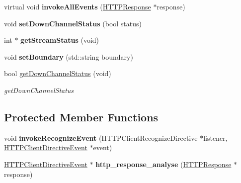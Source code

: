 \begin{DoxyCompactItemize}
virtual void {\bfseries invoke\+All\+Events} (\hyperlink{classNetwork_1_1HTTP_1_1HTTPResponse}{H\+T\+T\+P\+Response} $\ast$response)
\item 
\mbox{\label{classNetwork_1_1HTTP2_1_1HTTP2ClientEventManager_ab5bdbbcdd686b974a61e1ca0a045570f}} 
void {\bfseries set\+Down\+Channel\+Status} (bool status)
\item 
\mbox{\label{classNetwork_1_1HTTP2_1_1HTTP2ClientEventManager_ada68eb3ae12bb259540cad78ac455d1f}} 
int $\ast$ {\bfseries get\+Stream\+Status} (void)
\item 
\mbox{\label{classNetwork_1_1HTTP2_1_1HTTP2ClientEventManager_a30df0cab5c3fc8c0dbb090b51ef0afb8}} 
void {\bfseries set\+Boundary} (std\+::string boundary)
\item 
bool \hyperlink{classNetwork_1_1HTTP2_1_1HTTP2ClientEventManager_ac7ae33977250bde85715967dc52ae1cf}{get\+Down\+Channel\+Status} (void)
\begin{DoxyCompactList}\small\item\em get\+Down\+Channel\+Status \end{DoxyCompactList}\end{DoxyCompactItemize}
\subsection*{Protected Member Functions}
\begin{DoxyCompactItemize}
\item 
\mbox{\label{classNetwork_1_1HTTP2_1_1HTTP2ClientEventManager_ad9625a75a8e37ef43af1e22ac6d372bc}} 
void {\bfseries invoke\+Recognize\+Event} (H\+T\+T\+P\+Client\+Recognize\+Directive $\ast$listener, \hyperlink{classNetwork_1_1HTTP_1_1HTTPClientDirectiveEvent}{H\+T\+T\+P\+Client\+Directive\+Event} $\ast$event)
\item 
\mbox{\label{classNetwork_1_1HTTP2_1_1HTTP2ClientEventManager_a6becf5f240cc72e4df027badd4fa48bd}} 
\hyperlink{classNetwork_1_1HTTP_1_1HTTPClientDirectiveEvent}{H\+T\+T\+P\+Client\+Directive\+Event} $\ast$ {\bfseries http\+\_\+response\+\_\+analyse} (\hyperlink{classNetwork_1_1HTTP_1_1HTTPResponse}{H\+T\+T\+P\+Response} $\ast$response)
\end{DoxyCompactItemize}
